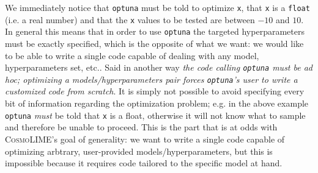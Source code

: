 
We immediately notice that \texttt{optuna} must be told to optimize \texttt{x}, that \texttt{x} is a \texttt{float} (i.e. a real number) and that the \texttt{x} values to be tested are between $-10$ and $10$. In general this means that in order to use \texttt{optuna} the targeted hyperparameters must be exactly specified, which is the opposite of what we want: we would like to be able to write a single code capable of dealing with any model, hyperparameters set, etc.. Said in another way \emph{the code calling \texttt{optuna} must be \emph{ad hoc}; optimizing a models/hyperparameters pair forces \texttt{optuna}'s user to write a customized code from scratch}. It is simply not possible to avoid specifying every bit of information regarding the optimization problem; e.g. in the above example \texttt{optuna} \emph{must} be told that \texttt{x} is a float, otherwise it will not know what to sample and therefore be unable to proceed.
This is the part that is at odds with \textsc{CosmoLIME}'s goal of generality: we want to write a single code capable of optimizing arbtrary, user-provided models/hyperparameters, but this is impossible because it requires code tailored to the specific model at hand.


